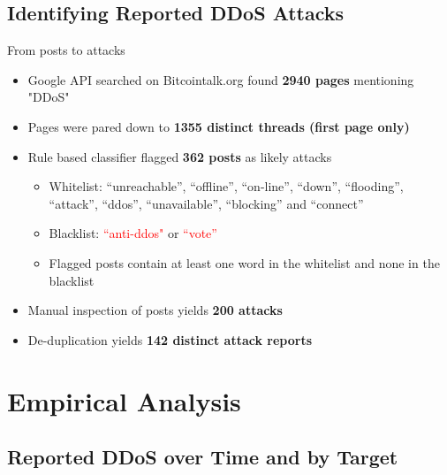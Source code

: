 \documentclass{beamer}
\begin{document}
\begin{frame}{}
\end{frame}


\subsection{Identifying Reported DDoS Attacks}

\begin{frame}{From posts to attacks}
\begin{itemize}
\item Google API searched on Bitcointalk.org found \textbf{2940 pages} mentioning "DDoS"
\item Pages were pared down to \textbf{1355 distinct threads (first page only)}
\item Rule based classifier flagged \textbf{362 posts} as likely attacks
\begin{itemize}
	\item Whitelist: ``unreachable'', ``offline'', ``on-line'', ``down'', ``flooding'', ``attack'', ``ddos'', ``unavailable'', ``blocking'' and ``connect''
	\item Blacklist: \textcolor{red}{``anti-ddos"} or \textcolor{red}{``vote''} 
	\item Flagged posts contain at least one word in the whitelist and none in the blacklist
\end{itemize}
\item Manual inspection of posts yields \textbf{200 attacks}
\item De-duplication yields \textbf{142 distinct attack reports}

\end{itemize}
\end{frame}

\section{Empirical Analysis}
\subsection{Reported DDoS over Time and by Target}
\end{document}
